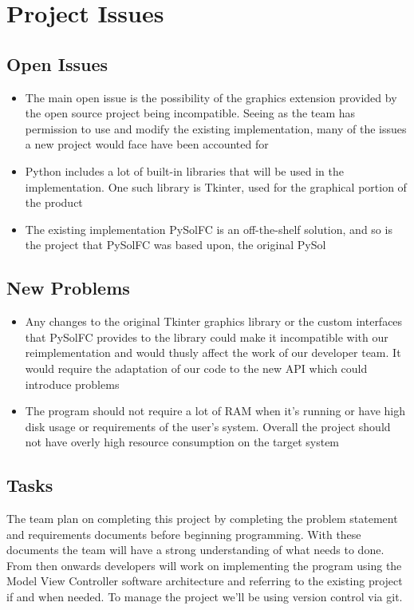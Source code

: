 \documentclass[12pt, titlepage]{article}
\begin{document}
	\section{Project Issues}
		\subsection{Open Issues}
		\begin{itemize}
		\itemsep0em	
			\item The main open issue is the possibility of the graphics extension
			provided by the open source project being incompatible. Seeing as the team
			has permission to use and modify the existing implementation, many of the
			issues a new project would face have been accounted for
			\item Python includes a lot of built-in libraries that will be used in the
			 implementation. One such library is Tkinter, used for the graphical portion
			of the product
			\item The existing implementation PySolFC is an off-the-shelf solution,
			and so is the project that PySolFC was based upon, the original PySol
		\end{itemize}
		\subsection{New Problems}
		\begin{itemize}
		\itemsep0em	
			\item Any changes to the original Tkinter graphics library or the 
			custom interfaces that PySolFC provides to the library could make it
			incompatible with our reimplementation and would thusly affect the work of
			our developer team. It would require the adaptation of our code to the new
			API which could introduce problems
			\item The program should not require a lot of RAM when it’s running or
			have high disk usage or requirements of the user’s system. Overall the
			project should not have overly high resource consumption on the target system\\
		\end{itemize}
		\subsection{Tasks}
			\indent The team plan on completing this project by completing the problem
			statement and requirements documents before beginning programming. With these
			documents the team will have a strong understanding of what needs to done.
			From then onwards developers will work on implementing the program using
			the Model View Controller software architecture and referring to the existing
			project if and when needed. To manage the project we’ll be using version
			control via git.\\
\end{document}
